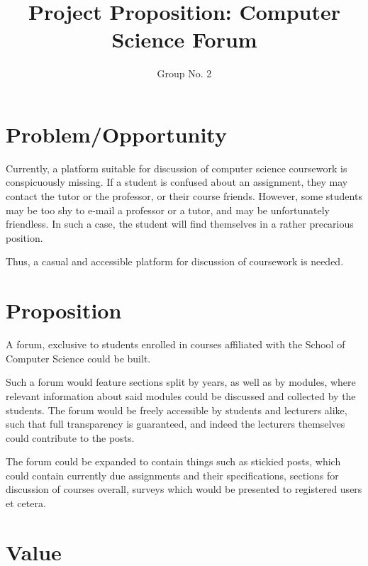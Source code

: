 \documentclass[a4paper, 12pt]{article}
\begin{document}
\title{Project Proposition: Computer Science Forum}
\author{Group No. 2}
\maketitle


	\section{Problem/Opportunity}

	Currently, a platform suitable for discussion of 
	computer science coursework is conspicuously missing. 
	If a student is confused about an assignment, they may 
	contact the tutor or the professor, or their course friends. 
	However, some students may be too shy to e-mail a professor or a 
	tutor, and may be unfortunately friendless. In such a case, 
	the student will find themselves in a rather precarious position.
 
	
	Thus, a casual and accessible platform for discussion of coursework is needed.



	\section{Proposition}

	 A forum, exclusive to students enrolled in courses affiliated with the School of Computer Science could be built.


	 Such a forum would feature sections split by 
	 years, as well as by modules, where relevant 
	 information about said modules could be discussed 
	 and collected by the students. The forum would be freely 
	 accessible by students and lecturers alike, such that 
	 full transparency is guaranteed, and indeed the 
	 lecturers themselves could contribute to the posts.


	 The forum could be expanded to contain things such as stickied posts, 
	 which could contain currently due assignments and their specifications, 
	 sections for discussion of courses overall, surveys which 
	 would be presented to registered users et cetera.


	
	\newpage

	\section{Value}
\end{document}
